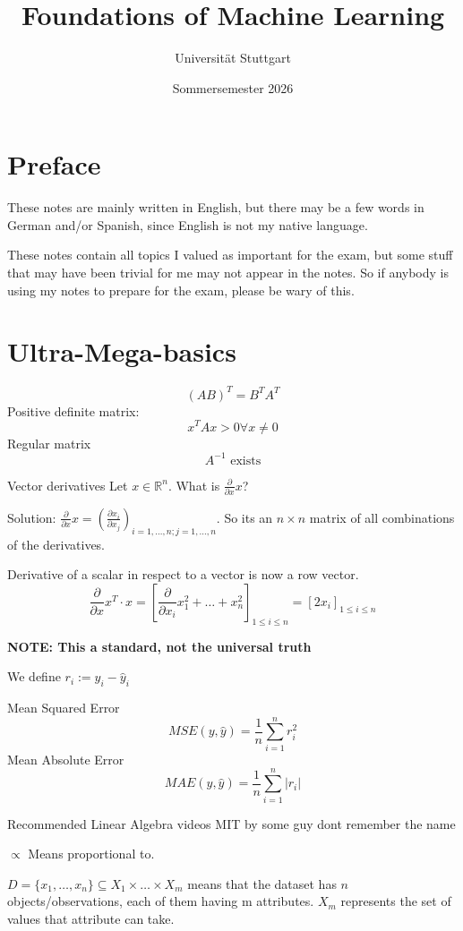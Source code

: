 \documentclass{article}
\begin{document}
\title{Foundations of Machine Learning}
\date{Sommersemester 2026}
\author{Universität Stuttgart}
\maketitle
\tableofcontents
\newpage
\section{Preface}
These notes are mainly written in English, but there may be a few words in German and/or Spanish, since English is not my native language.

These notes contain all topics I valued as important for the exam, but some stuff that may have been trivial for me may not appear in the notes. So if anybody is using my notes to 
prepare for the exam, please be wary of this.

\section{Ultra-Mega-basics}
\[(AB)^T = B^TA^T\]
Positive definite matrix:
\[x^T Ax > 0 \forall x \neq 0\]
Regular matrix
\[A^{-1} \text{ exists}\]

Vector derivatives
Let $x \in \mathbb{R}^n$. What is $\frac{\partial}{\partial x}x$?

Solution: $\frac{\partial}{\partial x}x = (\frac{\partial x_i}{\partial x_j})_{i = 1,\dots,n; j=1,\dots,n}$. So its an $n\times n$ matrix of all combinations of the derivatives.

Derivative of a scalar in respect to a vector is now a row vector.
\[\frac{\partial}{\partial x}x^T \cdot x = [\frac{\partial}{\partial x_i}x_1^2 + \dots + x_n^2]_{1\leq i \leq n} = [2x_i]_{1\leq i \leq n}\]

\textbf{NOTE: This a standard, not the universal truth}

We define $r_i := y_i - \hat{y}_i$

Mean Squared Error
\[MSE(y,\hat{y}) = \frac{1}{n}\sum_{i=1}^{n}r_i^2\]
Mean Absolute Error
\[MAE(y,\hat{y}) = \frac{1}{n}\sum_{i=1}^{n}|r_i|\]

Recommended Linear Algebra videos MIT by some guy dont remember the name

$\propto$ Means proportional to.

$D = \{x_1,\dots,x_n\} \subseteq X_1\times\dots\times X_m$ means that the dataset has $n$ objects/observations, each of them having m attributes. $X_m$ represents the set of values that attribute can take.  
\end{document}
